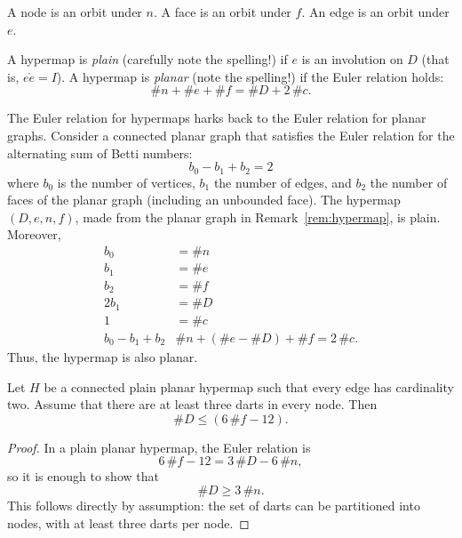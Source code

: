 \begin{definition}  A node is an orbit  under $n$.  A face is an  orbit  under $f$.  An edge is an orbit under $e$. 
\end{definition}

\begin{definition} A hypermap is {\it plain} (carefully note the spelling!) if
$e$ is an involution on $D$ (that is, $e\ocirc e = I$).  A hypermap
is {\it planar} (note the spelling!) if the Euler relation holds:
    $$\# n + \# e + \# f = \# D + 2\, \#c.$$
\end{definition}


\begin{remark}\label{rem:Euler}  The Euler relation for hypermaps harks back
to the Euler relation for planar graphs.
Consider a connected planar graph that satisfies the
Euler relation for the alternating sum of Betti numbers:
    $$b_0 - b_1 + b_2 = 2$$
where $b_0$ is the number of vertices, $b_1$ the number of edges, and
$b_2$ the number of faces of the planar graph (including an unbounded face). The
hypermap $(D,e,n,f)$, made from the planar graph in
Remark~\ref{rem:hypermap}, is plain.
Moreover,
    $$\begin{array}{lll}
    b_0 &= \# n\\
    b_1 &= \# e\\
    b_2 &= \# f\\
    2b_1 &= \# D\\
    1 &= \#c\\
    b_0 - b_1 + b_2  &\# n + (\#e - \#D) + \# f = 2\,\# c.
    \end{array}
    $$
Thus, the hypermap is also planar.
\end{remark}


\begin{lemma}\label{lemma:dart-upper} 
Let $H$ be a connected plain planar hypermap such that every edge has cardinality two.  Assume that
there are at least three darts in every node.  Then
$$
\# D \le (6\, \#f - 12).
$$
\end{lemma}

\begin{proof}  In a plain planar hypermap, the Euler relation is
$$6\, \#f - 12 = 3\,\#D - 6\,\#n,$$
so it is enough to show that
$$
\# D \ge 3\,\#n.
$$
This follows directly by assumption: the set of darts can be partitioned into nodes, with at least three darts per node.
\end{proof}



